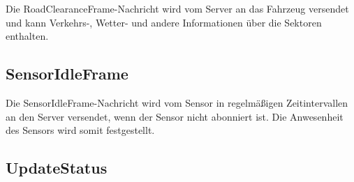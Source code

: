 Die RoadClearanceFrame-Nachricht wird vom Server an das Fahrzeug versendet und kann Verkehrs-, Wetter- und andere Informationen über die Sektoren enthalten.

\subsection{SensorIdleFrame}
\label{msg:sensor_idle_frame}

Die SensorIdleFrame-Nachricht wird vom Sensor in regelmäßigen Zeitintervallen an den Server versendet, wenn der Sensor nicht abonniert ist.
Die Anwesenheit des Sensors wird somit festgestellt.

\subsection{UpdateStatus}



%		
%		
%		


